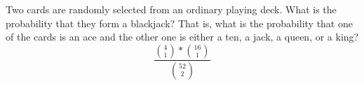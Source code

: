 \item Two cards are randomly selected from an ordinary playing deck. What is the probability that they form a blackjack? That is, what is the probability that one of the cards is an ace and the other one is either a ten, a jack, a queen, or a king?
\[
\frac{\binom{4}{1} * \binom{16}{1}}{\binom{52}{2}}
\]